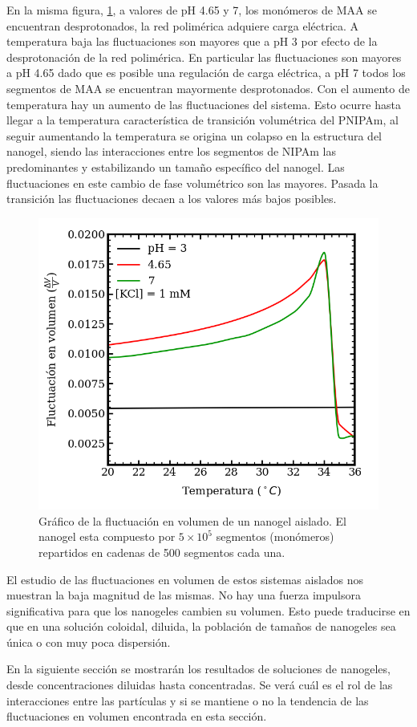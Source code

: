 	En la misma figura, \ref{fig:mc:fluct-T}, a valores de pH 4.65 y 7, los mon\'omeros de MAA se encuentran  desprotonados, la red polim\'erica adquiere carga el\'ectrica. 
	A temperatura baja las fluctuaciones son mayores que a pH 3 por efecto de la desprotonaci\'on de la red polim\'erica. En particular las fluctuaciones son mayores a pH 4.65 dado que es posible una regulaci\'on de carga el\'ectrica, a pH 7 todos los segmentos de MAA se encuentran mayormente desprotonados.
	Con el aumento de temperatura hay un aumento de las fluctuaciones del sistema.
	Esto ocurre hasta llegar a la temperatura caracter\'istica de transici\'on volum\'etrica del PNIPAm, al seguir aumentando la temperatura se origina un colapso en la estructura del nanogel, siendo las interacciones entre los segmentos de NIPAm las predominantes y estabilizando un tama\~no espec\'ifico del nanogel.
	Las fluctuaciones en este cambio de fase volum\'etrico son las mayores. Pasada la transici\'on las fluctuaciones decaen a los valores m\'as bajos posibles.
	
	
	
	\begin{figure}
		\centering
		\includegraphics[width=0.45\linewidth]{Figures/graph-mc/fluct-T.png}
		\caption{Gr\'afico de la fluctuaci\'on en volumen de un nanogel aislado. El nanogel esta compuesto por $5\times 10^5$ segmentos (mon\'omeros) repartidos en cadenas de 500 segmentos cada una.}
		\label{fig:mc:fluct-T}
	\end{figure}
	
	
	El estudio de las fluctuaciones en volumen de estos sistemas aislados nos muestran la baja magnitud de las mismas. No hay una fuerza impulsora significativa para que los nanogeles cambien su volumen. Esto puede traducirse en que en una soluci\'on coloidal, diluida, la poblaci\'on de tama\~nos de nanogeles sea \'unica o con muy poca dispersi\'on. 
	
	En la siguiente secci\'on se mostrar\'an los resultados de soluciones de nanogeles, desde concentraciones diluidas hasta concentradas.
	Se ver\'a cu\'al es el rol de las interacciones entre las part\'iculas y si se mantiene o no la tendencia de las fluctuaciones en volumen encontrada en esta secci\'on.
	

